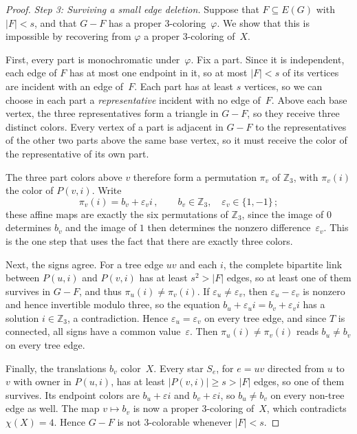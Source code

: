 \documentclass[11pt,letterpaper]{article}
\numberwithin{equation}{section}
\theoremstyle{plain}
\theoremstyle{definition}
\theoremstyle{remark}
\newcommand{\Z}{\mathbb{Z}}
\begin{document}
\begin{proof}
\emph{Step 3: Surviving a small edge deletion.}
Suppose that $F\subseteq E(G)$ with $|F|<s$, and that $G-F$ has a proper $3$-coloring~$\varphi$. We show that this is impossible by recovering from $\varphi$ a proper $3$-coloring of~$X$.

First, every part is monochromatic under~$\varphi$. Fix a part. Since it is independent, each edge of $F$ has at most one endpoint in it, so at most $|F|<s$ of its vertices are incident with an edge of~$F$. Each part has at least $s$ vertices, so we can choose in each part a \emph{representative} incident with no edge of~$F$. Above each base vertex, the three representatives form a triangle in $G-F$, so they receive three distinct colors. Every vertex of a part is adjacent in $G-F$ to the representatives of the other two parts above the same base vertex, so it must receive the color of the representative of its own part.

The three part colors above $v$ therefore form a permutation $\pi_v$ of $\Z_3$, with $\pi_v(i)$ the color of $P(v,i)$. Write
\begin{equation}\label{eq:affine}
  \pi_v(i)=b_v+\varepsilon_v i\,,\qquad b_v\in\Z_3,\quad \varepsilon_v\in\{1,-1\}\,;
\end{equation}
these affine maps are exactly the six permutations of $\Z_3$, since the image of $0$ determines $b_v$ and the image of $1$ then determines the nonzero difference~$\varepsilon_v$. This is the one step that uses the fact that there are exactly three colors.

Next, the signs agree. For a tree edge $uv$ and each $i$, the complete bipartite link between $P(u,i)$ and $P(v,i)$ has at least $s^2>|F|$ edges, so at least one of them survives in $G-F$, and thus $\pi_u(i)\ne\pi_v(i)$. If $\varepsilon_u\ne\varepsilon_v$, then $\varepsilon_u-\varepsilon_v$ is nonzero and hence invertible modulo three, so the equation $b_u+\varepsilon_u i=b_v+\varepsilon_v i$ has a solution $i\in\Z_3$, a contradiction. Hence $\varepsilon_u=\varepsilon_v$ on every tree edge, and since $T$ is connected, all signs have a common value~$\varepsilon$. Then $\pi_u(i)\ne\pi_v(i)$ reads $b_u\ne b_v$ on every tree edge.

Finally, the translations $b_v$ color~$X$. Every star $S_e$, for $e=uv$ directed from $u$ to $v$ with owner in $P(u,i)$, has at least $|P(v,i)|\ge s>|F|$ edges, so one of them survives. Its endpoint colors are $b_u+\varepsilon i$ and $b_v+\varepsilon i$, so $b_u\ne b_v$ on every non-tree edge as well. The map $v\mapsto b_v$ is now a proper $3$-coloring of~$X$, which contradicts $\chi(X)=4$. Hence $G-F$ is not $3$-colorable whenever $|F|<s$.


\end{proof}
\end{document}
